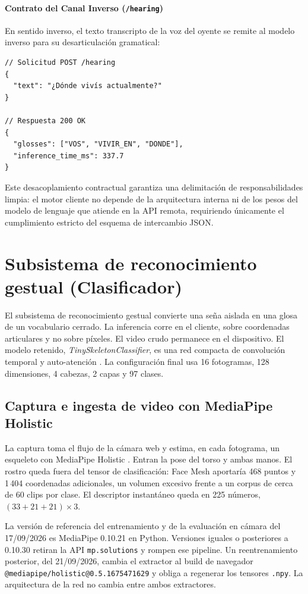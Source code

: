 \paragraph{Contrato del Canal Inverso (\texttt{/hearing})}
En sentido inverso, el texto transcripto de la voz del oyente se remite al modelo inverso para su desarticulación gramatical:
\begin{verbatim}
// Solicitud POST /hearing
{
  "text": "¿Dónde vivís actualmente?"
}

// Respuesta 200 OK
{
  "glosses": ["VOS", "VIVIR_EN", "DONDE"],
  "inference_time_ms": 337.7
}
\end{verbatim}

Este desacoplamiento contractual garantiza una delimitación de responsabilidades limpia: el motor cliente no depende de la arquitectura interna ni de los pesos del modelo de lenguaje que atiende en la API remota, requiriendo únicamente el cumplimiento estricto del esquema de intercambio JSON.

\section{Subsistema de reconocimiento gestual (Clasificador)}

El subsistema de reconocimiento gestual convierte una seña aislada en una glosa de un vocabulario cerrado. La inferencia corre en el cliente, sobre coordenadas articulares y no sobre píxeles. El video crudo permanece en el dispositivo. El modelo retenido, \textit{TinySkeletonClassifier}, es una red compacta de convolución temporal y auto-atención \parencite{vaswani2017attention, wu2020lite}. La configuración final usa 16 fotogramas, 128 dimensiones, 4 cabezas, 2 capas y 97 clases.

\subsection{Captura e ingesta de video con MediaPipe Holistic}

La captura toma el flujo de la cámara web y estima, en cada fotograma, un esqueleto con MediaPipe Holistic \parencite{google2020mediapipe}. Entran la pose del torso y ambas manos. El rostro queda fuera del tensor de clasificación: Face Mesh aportaría 468 puntos y 1\,404 coordenadas adicionales, un volumen excesivo frente a un corpus de cerca de 60 clips por clase. El descriptor instantáneo queda en 225 números, $(33 + 21 + 21) \times 3$.

La versión de referencia del entrenamiento y de la evaluación en cámara del 17/09/2026 es MediaPipe 0.10.21 en Python. Versiones iguales o posteriores a 0.10.30 retiran la API \texttt{mp.solutions} y rompen ese pipeline. Un reentrenamiento posterior, del 21/09/2026, cambia el extractor al build de navegador \texttt{@mediapipe/holistic@0.5.1675471629} y obliga a regenerar los tensores \texttt{.npy}. La arquitectura de la red no cambia entre ambos extractores.

